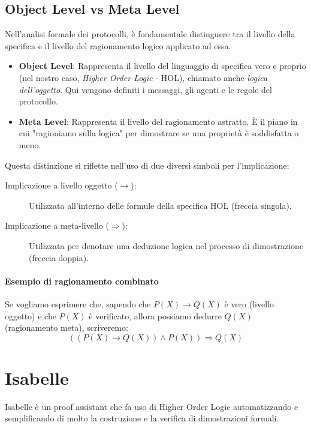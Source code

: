 \subsection{Object Level vs Meta Level}

Nell'analisi formale dei protocolli, è fondamentale distinguere tra il livello della specifica e il livello del ragionamento logico applicato ad essa.

\begin{itemize}
    \item \textbf{Object Level}: Rappresenta il livello del linguaggio di specifica vero e proprio (nel nostro caso, \textit{Higher Order Logic} - HOL), chiamato anche \textit{logica dell'oggetto}. Qui vengono definiti i messaggi, gli agenti e le regole del protocollo.
    \item \textbf{Meta Level}: Rappresenta il livello del ragionamento astratto. È il piano in cui "ragioniamo sulla logica" per dimostrare se una proprietà è soddisfatta o meno.
\end{itemize}

Questa distinzione si riflette nell'uso di due diversi simboli per l'implicazione:

\begin{description}
    \item[Implicazione a livello oggetto ($\rightarrow$):] Utilizzata all'interno delle formule della specifica HOL (freccia singola).
    \item[Implicazione a meta-livello ($\Longrightarrow$):] Utilizzata per denotare una deduzione logica nel processo di dimostrazione (freccia doppia).
\end{description}

\paragraph{Esempio di ragionamento combinato}
Se vogliamo esprimere che, sapendo che $P(X) \rightarrow Q(X)$ è vero (livello oggetto) e che $P(X)$ è verificato, allora possiamo dedurre $Q(X)$ (ragionamento meta), scriveremo:
\[ ((P(X) \rightarrow Q(X)) \wedge P(X)) \Longrightarrow Q(X) \]

\section{Isabelle}
Isabelle è un proof assistant che fa uso di Higher Order Logic automatizzando e semplificando di molto la costruzione e la verifica di dimostrazioni formali.

